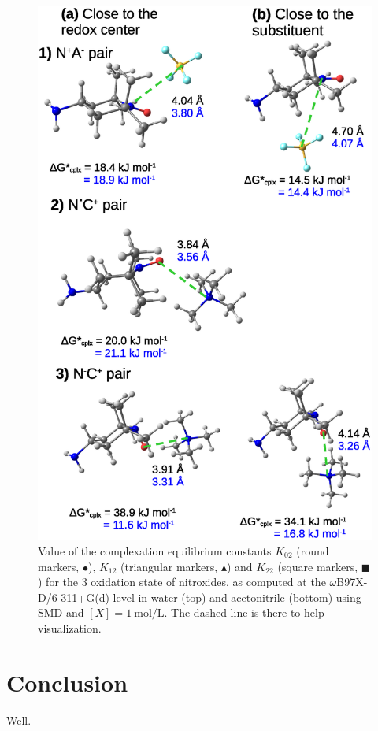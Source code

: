 \documentclass[review]{elsarticle}
\begin{document}
\begin{figure}[!h]
\centering
\includegraphics[width=\linewidth]{Figure12}
\caption{Value of the complexation equilibrium constants $K_{02}$ (round markers, $\bullet$), $K_{12}$ (triangular markers, $\blacktriangle$) and $K_{22}$ (square markers, $\blacksquare$) for the 3 oxidation state of nitroxides, as computed at the $\omega$B97X-D/6-311+G(d) level in water (top) and acetonitrile (bottom) using SMD and $[X]=\SI{1}{\mole\per\liter}$.  The dashed line is there to help visualization. }
\label{fig:Kx2}
\end{figure}

\clearpage
\section{Conclusion}

Well.
	
	
 

	
\end{document}
